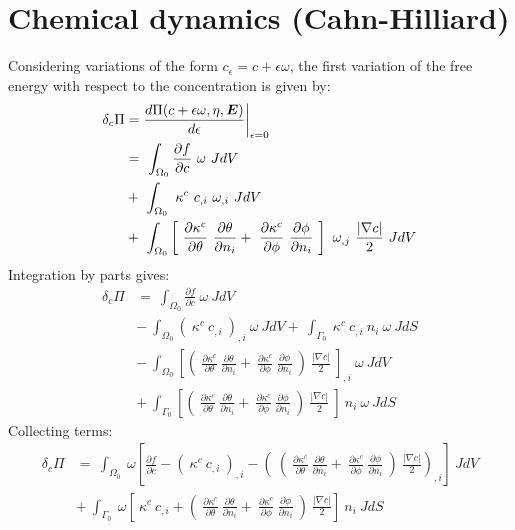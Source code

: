 \section{Chemical dynamics (Cahn-Hilliard)}
Considering variations of the form $c_{\epsilon} = c + \epsilon \omega$, the first variation of the free energy with respect to the concentration is given by:
\begin{align}
\delta_{c}\Pi &= \frac{d \Pi(c + \epsilon \omega, \eta, \mbox{\boldmath$ E$})}{d\epsilon} \bigg|_{\epsilon=0} \notag  \nonumber \\
  &= ~\int_{\Omega_0}  \frac{\partial f}{\partial c}~\omega ~J dV  \nonumber \\
  &+ ~\int_{\Omega_0}  ~\kappa^c~c_{,i}~\omega_{,i} ~J dV  \nonumber \\
  &+ ~\int_{\Omega_0}  \left[ ~\frac{\partial \kappa^c}{\partial \theta}  ~\frac{\partial \theta}{\partial n_i} +  ~\frac{\partial \kappa^c}{\partial \phi} ~\frac{\partial \phi}{\partial n_i} ~\right] ~\omega_{,j} ~\frac{|\nabla c|}{2} ~J dV 
\end{align}
Integration by parts gives:
\begin{align}
\delta_{c}\Pi &= ~\int_{\Omega_0}  \frac{\partial f}{\partial c}~\omega ~J dV  \nonumber \\
  &- ~\int_{\Omega_0}  \left(~\kappa^c~c_{,i}~\right)_{,i} ~\omega ~J dV + ~\int_{\Gamma_0} ~\kappa^c~c_{,i} ~n_{i} ~\omega ~J dS  \nonumber \\
  &- ~\int_{\Omega_0}  \left[ \left( ~\frac{\partial \kappa^c}{\partial \theta} ~\frac{\partial \theta}{\partial n_i} +  ~\frac{\partial \kappa^c}{\partial \phi} ~\frac{\partial \phi}{\partial n_i} ~\right) ~\frac{|\nabla c|}{2} ~\right]_{,i} ~\omega ~J dV  \nonumber \\
  &+ ~\int_{\Gamma_0}  \left[ \left( ~\frac{\partial \kappa^c}{\partial \theta} ~\frac{\partial \theta}{\partial n_i} +  ~\frac{\partial \kappa^c}{\partial \phi} ~\frac{\partial \phi}{\partial n_i} ~\right) ~\frac{|\nabla c|}{2} ~\right] ~n_{i} ~\omega ~J dS 
\end{align}
Collecting terms:
\begin{align}
\delta_{c}\Pi &= ~\int_{\Omega_0}  ~\omega \left[\frac{\partial f}{\partial c} - \left(~\kappa^c~c_{,i}~\right)_{,i} - \left( ~\left(~\frac{\partial \kappa^c}{\partial \theta} ~\frac{\partial \theta}{\partial n_i} +  ~\frac{\partial \kappa^c}{\partial \phi} ~\frac{\partial \phi}{\partial n_i} ~\right) ~\frac{|\nabla c|}{2} \right)_{,i}  \right] ~J dV  \nonumber \\
  &+ ~\int_{\Gamma_0} ~\omega \left[ ~\kappa^c~c_{,i}  + \left( ~\frac{\partial \kappa^c}{\partial \theta} ~\frac{\partial \theta}{\partial n_i} +  ~\frac{\partial \kappa^c}{\partial \phi} ~\frac{\partial \phi}{\partial n_i} ~\right) ~\frac{|\nabla c|}{2}  \right] ~n_{i} ~J dS
\end{align}
